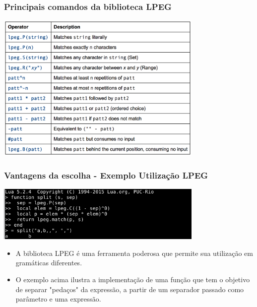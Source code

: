 \documentclass{beamer}
\begin{document}
\begin{frame}
    \frametitle{Principais comandos da biblioteca LPEG}
    \includegraphics[width=10cm]{images/lpeg-commands.png}
\end{frame}

\begin{frame}
    \frametitle{Vantagens da escolha - Exemplo Utilização LPEG}
    \includegraphics[width=10cm]{images/lpeg2.png}
    \begin{itemize}
        \item A biblioteca LPEG é uma ferramenta poderosa que permite sua utilização em gramáticas diferentes. 
        \item O exemplo acima ilustra a implementação de uma função que tem o objetivo de separar "pedaços" da expressão, a partir de um separador passado como parâmetro e uma expressão. 
    \end{itemize}
\end{frame}

\begin{frame}
\end{frame}
\end{document}
